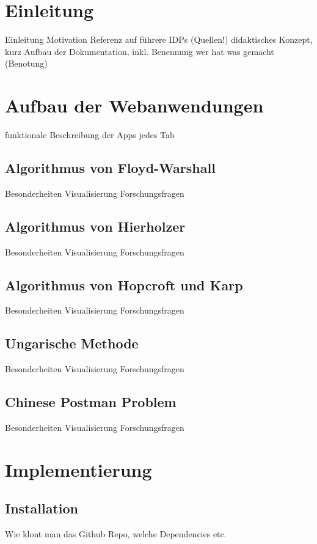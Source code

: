 \chapter{Einleitung}
Einleitung
Motivation
Referenz auf führere IDPs (Quellen!)
didaktisches Konzept, kurz
Aufbau der Dokumentation, inkl. Benennung wer hat was gemacht (Benotung)


\chapter{Aufbau der Webanwendungen}
funktionale Beschreibung der Apps
jedes Tab

\section{Algorithmus von Floyd-Warshall}
Besonderheiten Visualisierung
Forschungsfragen

\section{Algorithmus von Hierholzer}
Besonderheiten Visualisierung
Forschungsfragen

\section{Algorithmus von Hopcroft und Karp}
Besonderheiten Visualisierung
Forschungsfragen

\section{Ungarische Methode}
Besonderheiten Visualisierung
Forschungsfragen

\section{Chinese Postman Problem}
Besonderheiten Visualisierung
Forschungsfragen

\chapter{Implementierung}

\section{Installation}
Wie klont man das Github Repo, welche Dependencies etc.

